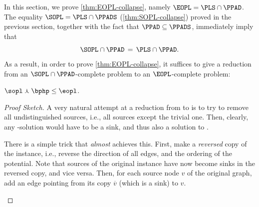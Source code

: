In this section, we prove \cref{thm:EOPL-collapse}, namely $\EOPL = \PLS\cap\PPAD$. The equality $\SOPL = \PLS\cap\PPADS$ (\cref{thm:SOPL-collapse}) proved in the previous section, together with the fact that $\PPAD \subseteq \PPADS$, immediately imply that
\[\SOPL\cap\PPAD \,=\, \PLS\cap\PPAD.\]
As a result, in order to prove \cref{thm:EOPL-collapse}, it suffices to give a reduction from an $\SOPL\cap\PPAD$-complete problem to an $\EOPL$-complete problem:

\begin{lemma}
$\sopl \curlywedge \bphp\leq\eopl$.
\label{lem:bphp_or_sopl_reduces_to_eopl}
\end{lemma}

\begin{proof}[Proof Sketch]
A very natural attempt at a reduction from \sopl to \eopl is to try to remove all undistinguished sources, i.e., all sources except the trivial one. Then, clearly, any \eopl-solution would have to be a sink, and thus also a solution to \sopl.

There is a simple trick that \emph{almost} achieves this. First, make a \emph{reversed} copy of the \sopl instance, i.e., reverse the direction of all edges, and the ordering of the potential. Note that sources of the original instance have now become sinks in the reversed copy, and vice versa. Then, for each source node $v$ of the original graph, add an edge pointing from its copy $\overline{v}$ (which is a sink) to $v$.

\begin{figure}[t]
\centering
\newcommand{\gadgetspace}{3}
\newcommand{\labelshift}{-1}

\end{figure}
\end{proof}
